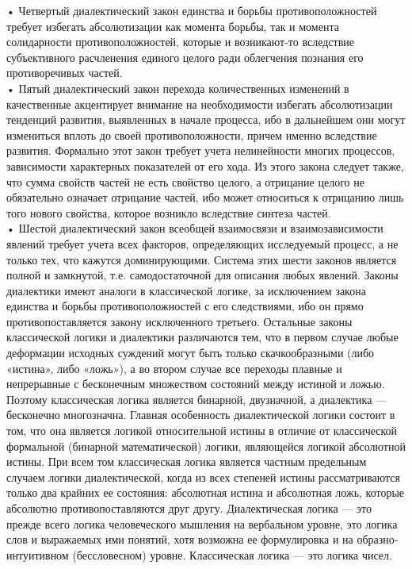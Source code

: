 \documentclass[a4paper,12pt]{report}
\begin{document}
    • Четвертый диалектический закон единства и борьбы противоположностей требует избегать абсолютизации как момента борьбы, так и момента солидарности противоположностей, которые и возникают-то вследствие субъективного расчленения единого целого ради облегчения познания его противоречивых частей.\\
    • Пятый диалектический закон перехода количественных изменений в качественные акцентирует внимание на необходимости избегать абсолютизации тенденций развития, выявленных в начале процесса, ибо в дальнейшем они могут измениться вплоть до своей противоположности, причем именно вследствие развития. Формально этот закон требует учета нелинейности многих процессов, зависимости характерных показателей от его хода.
Из этого закона следует также, что сумма свойств частей не есть свойство целого, а отрицание целого не обязательно означает отрицание частей, ибо может относиться к отрицанию лишь того нового свойства, которое возникло вследствие синтеза частей.\\
    • Шестой диалектический закон всеобщей взаимосвязи и взаимозависимости явлений требует учета всех факторов, определяющих исследуемый процесс, а не только тех, что кажутся доминирующими.
Система этих шести законов является полной и замкнутой, т.е. самодостаточной для описания любых явлений. Законы диалектики имеют аналоги в классической логике, за исключением закона единства и борьбы противоположностей с его следствиями, ибо он прямо противопоставляется закону исключенного третьего. Остальные законы классической логики и диалектики различаются тем, что в первом случае любые деформации исходных суждений могут быть только скачкообразными (либо «истина», либо «ложь»), а во втором случае все переходы плавные и непрерывные с бесконечным множеством состояний между истиной и ложью. Поэтому классическая логика является бинарной, двузначной, а диалектика — бесконечно многозначна. Главная особенность диалектической логики состоит в том, что она является логикой относительной истины в отличие от классической формальной (бинарной математической) логики, являющейся логикой абсолютной истины. При всем том классическая логика является частным предельным случаем логики диалектической, когда из всех степеней истины рассматриваются только два крайних ее состояния: абсолютная истина и абсолютная ложь, которые абсолютно противопоставляются друг другу.
	Диалектическая логика — это прежде всего логика человеческого мышления на вербальном уровне, это логика слов и выражаемых ими понятий, хотя возможна ее формулировка и на образно-интуитивном (бессловесном) уровне. Классическая логика — это логика чисел.\\[Денисов]
	
\end{document}
